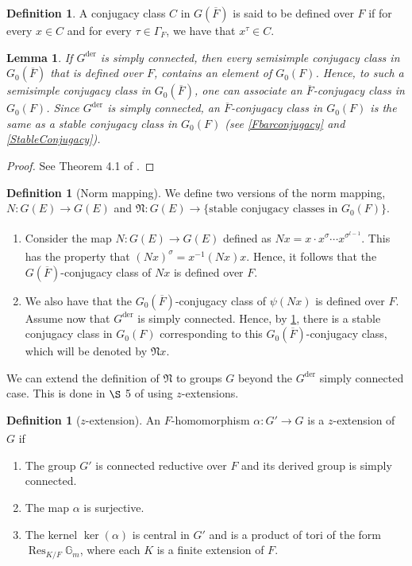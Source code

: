 \documentclass[11pt,a4paper]{article}
\theoremstyle{definition}
\newtheorem{D}[shared]{Definition}
\theoremstyle{plain}
\newtheorem{Le}[shared]{Lemma}
\theoremstyle{remark}
\theoremstyle{plain}
\DeclareMathOperator{\Res}{Res}
\begin{document}
\begin{D}
    A conjugacy class $C$ in $G(\overline{F})$ is said to be defined over $F$ if for every $x \in C$ and for every $\tau \in \Gamma_F$, we have that $x^{\tau} \in C$.
\end{D}

\begin{Le}\label{conjugacyclassdefoverFlemma}
    If $G^{\text{der}}$ is simply connected, then every semisimple conjugacy class in $G_0(\overline{F})$ that is defined over $F$, contains an element of $G_0(F)$. Hence, to such a semisimple conjugacy class in $G_0(\overline{F})$, one can associate an $\overline{F}$-conjugacy class in $G_0(F)$. Since $G^{\text{der}}$ is simply connected, an $\overline{F}$-conjugacy class in $G_0(F)$ is the same as a stable conjugacy class in $G_0(F)$ (see \ref{Fbarconjugacy} and \ref{StableConjugacy}).
\end{Le}
\begin{proof}
    See Theorem 4.1 of \cite{MR683003}.
\end{proof}

\begin{D}[Norm mapping]\label{normmap}
    We define two versions of the norm mapping, $N: G(E) \xrightarrow[]{} G(E)$ and $\mathfrak{N}: G(E) \xrightarrow[]{} \{ \text{stable conjugacy classes in }G_0(F) \}$.
    \begin{enumerate}
        \item Consider the map $N: G(E) \xrightarrow[]{} G(E)$ defined as $Nx = x \cdot x^{\sigma} \cdots x^{\sigma^{l-1}}$. This has the property that $(Nx)^{\sigma} = x^{-1} (Nx) x$. Hence, it follows that the $G(\overline{F})$-conjugacy class of $Nx$ is defined over $F$.
        \item We also have that the $G_0(\overline{F})$-conjugacy class of $\psi(Nx)$ is defined over $F$. Assume now that $G^{\text{der}}$ is simply connected. Hence, by \ref{conjugacyclassdefoverFlemma}, there is a stable conjugacy class in $G_0(F)$ corresponding to this $G_0(\overline{F})$-conjugacy class, which will be denoted by $\mathfrak{N}x$.
    \end{enumerate}
\end{D}

We can extend the definition of $\mathfrak{N}$ to groups $G$ beyond the $G^{\text{der}}$ simply connected case. This is done in $\S$ 5 of \cite{MR683003} using $z$-extensions.

\begin{D}[$z$-extension]
    An $F$-homomorphism $\alpha:G' \xrightarrow[]{} G$ is a $z$-extension of $G$ if
    \begin{enumerate}
        \item The group $G'$ is connected reductive over $F$ and its derived group is simply connected.
        \item The map $\alpha$ is surjective.
        \item The kernel $\ker(\alpha)$ is central in $G'$ and is a product of tori of the form $\Res_{K/F} \mathbb{G}_m$, where each $K$ is a finite extension of $F$.
    \end{enumerate}
\end{D}
\end{document}

